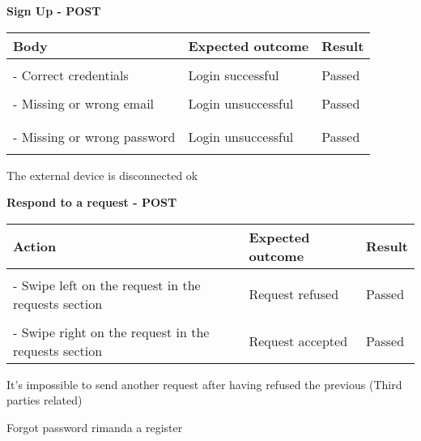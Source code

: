 \textbf{Sign Up - POST}
\begin{center}
	\begin{tabular}{|p{}|p{}|p{}|}
		\hline
		Body & Expected outcome & Result \\
		\hline
		&&\\
		- Correct credentials & Login successful & Passed\\
		\hline
		&&\\
		- Missing or wrong email & Login unsuccessful & Passed\\
		&&\\
		\hline
		&&\\
		- Missing or wrong password & Login unsuccessful & Passed\\
		&&\\
		\hline
	\end{tabular}
\end{center}

\newpage
The external device is disconnected ok

\textbf{Respond to a request - POST}
\begin{center}
	\begin{tabular}{|p{}|p{}|p{}|}
		\hline
		Action & Expected outcome & Result \\
		\hline
		&&\\
		- Swipe left on the request in the requests section & Request refused & Passed\\
		\hline
		&&\\
		- Swipe right on the request in the requests section & Request accepted & Passed\\
	\end{tabular}
\end{center}

\newpage

It's impossible to send another request after having refused the previous (Third parties related)

Forgot password rimanda a register